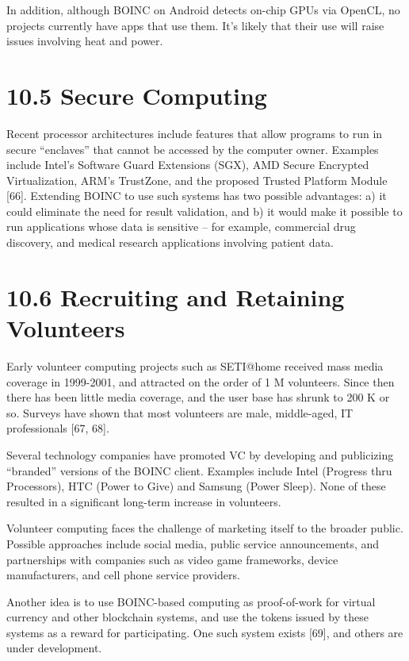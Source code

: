 \documentclass[
]{article}
\begin{document}
In addition, although BOINC on Android detects on-chip GPUs via OpenCL,
no projects currently have apps that use them. It's likely that their
use will raise issues involving heat and power.

\section{10.5 Secure Computing}\label{secure-computing}

Recent processor architectures include features that allow programs to
run in secure ``enclaves'' that cannot be accessed by the computer
owner. Examples include Intel's Software Guard Extensions (SGX), AMD
Secure Encrypted Virtualization, ARM's TrustZone, and the proposed
Trusted Platform Module {[}66{]}. Extending BOINC to use such systems
has two possible advantages: a) it could eliminate the need for result
validation, and b) it would make it possible to run applications whose
data is sensitive -- for example, commercial drug discovery, and medical
research applications involving patient data.

\section{10.6 Recruiting and Retaining
Volunteers}\label{recruiting-and-retaining-volunteers}

Early volunteer computing projects such as SETI@home received mass media
coverage in 1999-2001, and attracted on the order of 1 M volunteers.
Since then there has been little media coverage, and the user base has
shrunk to 200 K or so. Surveys have shown that most volunteers are male,
middle-aged, IT professionals {[}67, 68{]}.

Several technology companies have promoted VC by developing and
publicizing ``branded'' versions of the BOINC client. Examples include
Intel (Progress thru Processors), HTC (Power to Give) and Samsung (Power
Sleep). None of these resulted in a significant long-term increase in
volunteers.

Volunteer computing faces the challenge of marketing itself to the
broader public. Possible approaches include social media, public service
announcements, and partnerships with companies such as video game
frameworks, device manufacturers, and cell phone service providers.

Another idea is to use BOINC-based computing as proof-of-work for
virtual currency and other blockchain systems, and use the tokens issued
by these systems as a reward for participating. One such system exists
{[}69{]}, and others are under development.
\end{document}
